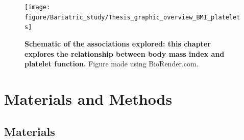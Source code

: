 \documentclass[11pt,twoside]{bristolthesis}
\begin{document}
\begin{figure}

{\centering \texttt{[image: figure/Bariatric\_study/Thesis\_graphic\_overview\_BMI\_platelets]} 

}

\caption[Schematic of the associations explored in the current chapter]{\textbf{Schematic of the associations explored: this chapter explores the relationship between body mass index and platelet function.} Figure made using BioRender.com.}\label{fig:BMI-platelet-overview2}
\end{figure}
\hypertarget{materials-and-methods}{%
\section{Materials and Methods}\label{materials-and-methods}}

\hypertarget{materials}{%
\subsection{Materials}\label{materials}}
\end{document}
